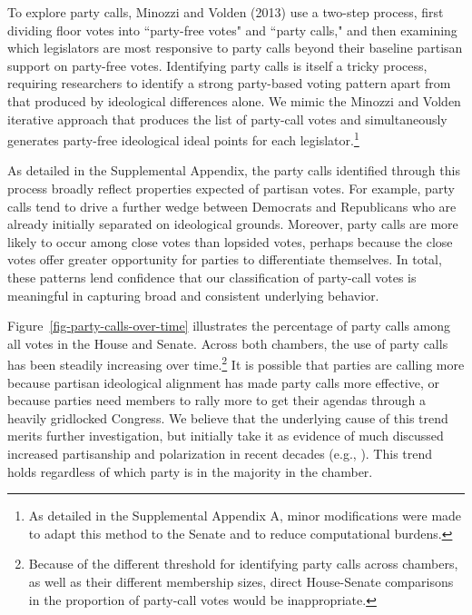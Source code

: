 \documentclass[12pt]{article}
\begin{document}
To explore party calls, Minozzi and Volden (2013) use a two-step process, first dividing floor votes into ``party-free votes" and ``party calls," and then examining which legislators are most responsive to party calls beyond their baseline partisan support on party-free votes. Identifying party calls is itself a tricky process, requiring researchers to identify a strong party-based voting pattern apart from that produced by ideological differences alone. We mimic the Minozzi and Volden iterative approach that produces the list of party-call votes and simultaneously generates party-free ideological ideal points for each legislator.\footnote{\doublespacing\normalsize As detailed in the Supplemental Appendix A, minor modifications were made to adapt this method to the Senate and to reduce computational burdens.}

As detailed in the Supplemental Appendix, the party calls identified through this process broadly reflect properties expected of partisan votes. For example, party calls tend to drive a further wedge between Democrats and Republicans who are already initially separated on ideological grounds. Moreover, party calls are more likely to occur among close votes than lopsided votes, perhaps because the close votes offer greater opportunity for parties to differentiate themselves.  In total, these patterns lend confidence that our classification of party-call votes is meaningful in capturing broad and consistent underlying behavior.

Figure~\ref{fig-party-calls-over-time} illustrates the percentage of party calls among all votes in the House and Senate. Across both chambers, the use of party calls has been steadily increasing over time.\footnote{\doublespacing\normalsize Because of the different threshold for identifying party calls across chambers, as well as their different membership sizes, direct House-Senate comparisons in the proportion of party-call votes would be inappropriate.} It is possible that parties are calling more because partisan ideological alignment has made party calls more effective, or because parties need members to rally more to get their agendas through a heavily gridlocked Congress. We believe that the underlying cause of this trend merits further investigation, but initially take it as evidence of much discussed increased partisanship and polarization in recent decades (e.g.,  \cite{Aldrich:2000, Lee:2009, Lee:2016, Theriault:2013, Smith:2014}). This trend holds regardless of which party is in the majority in the chamber.
\end{document}
